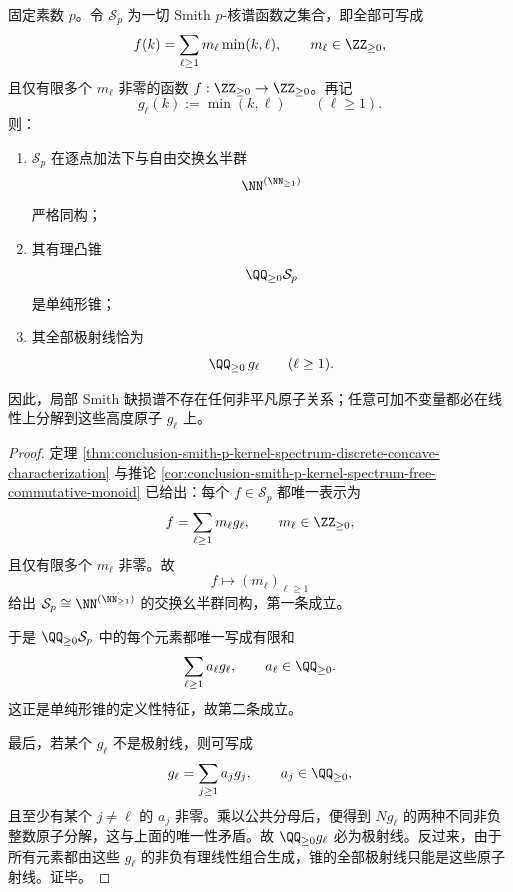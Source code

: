 \begin{theorem}\label{thm:conclusion-smith-p-kernel-spectrum-cone-simplicial}
固定素数 \(p\)。令 \(\mathcal S_p\) 为一切 Smith \(p\)-核谱函数之集合，即全部可写成
\[
f(k)=\sum_{\ell\ge 1}m_\ell\min(k,\ell),
\qquad
m_\ell\in \ZZ_{\ge 0},
\]
且仅有限多个 \(m_\ell\) 非零的函数 \(f:\ZZ_{\ge 0}\to \ZZ_{\ge 0}\)。再记
\[
g_\ell(k):=\min(k,\ell)
\qquad(\ell\ge 1).
\]
则：
\begin{enumerate}
  \item \(\mathcal S_p\) 在逐点加法下与自由交换幺半群
        \[
        \NN^{(\NN_{\ge 1})}
        \]
        严格同构；
  \item 其有理凸锥
        \[
        \QQ_{\ge 0}\mathcal S_p
        \]
        是单纯形锥；
  \item 其全部极射线恰为
        \[
        \QQ_{\ge 0}\,g_\ell
        \qquad(\ell\ge 1).
        \]
\end{enumerate}
因此，局部 Smith 缺损谱不存在任何非平凡原子关系；任意可加不变量都必在线性上分解到这些高度原子 \(g_\ell\) 上。
\end{theorem}
\begin{proof}
定理 \ref{thm:conclusion-smith-p-kernel-spectrum-discrete-concave-characterization} 与推论 \ref{cor:conclusion-smith-p-kernel-spectrum-free-commutative-monoid} 已给出：每个 \(f\in\mathcal S_p\) 都唯一表示为
\[
f=\sum_{\ell\ge 1}m_\ell g_\ell,
\qquad
m_\ell\in \ZZ_{\ge 0},
\]
且仅有限多个 \(m_\ell\) 非零。故
\[
f\longmapsto (m_\ell)_{\ell\ge 1}
\]
给出 \(\mathcal S_p\cong \NN^{(\NN_{\ge 1})}\) 的交换幺半群同构，第一条成立。

于是 \(\QQ_{\ge 0}\mathcal S_p\) 中的每个元素都唯一写成有限和
\[
\sum_{\ell\ge 1}a_\ell g_\ell,
\qquad
a_\ell\in \QQ_{\ge 0}.
\]
这正是单纯形锥的定义性特征，故第二条成立。

最后，若某个 \(g_\ell\) 不是极射线，则可写成
\[
g_\ell=\sum_{j\ge 1}a_j g_j,
\qquad
a_j\in\QQ_{\ge 0},
\]
且至少有某个 \(j\neq \ell\) 的 \(a_j\) 非零。乘以公共分母后，便得到 \(N g_\ell\) 的两种不同非负整数原子分解，这与上面的唯一性矛盾。故 \(\QQ_{\ge 0}g_\ell\) 必为极射线。反过来，由于所有元素都由这些 \(g_\ell\) 的非负有理线性组合生成，锥的全部极射线只能是这些原子射线。证毕。
\end{proof}


